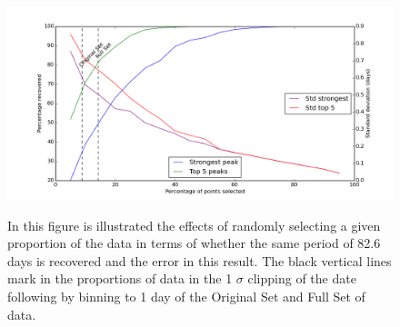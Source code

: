 \begin{figure}[!htbp]
\begin{center}
\includegraphics[scale=0.4]{Figures/prop.png} \\
\end{center}   
\caption{In this figure is illustrated the effects of randomly selecting a given proportion of the {\asas} data in terms
  of whether the same period of 82.6 days is recovered and the error in this result. The black vertical lines mark in
  the proportions of data in the 1 $\sigma$ clipping of the {\harps} date following by binning to 1 day of the Original
  Set and Full Set of data.}
\protect\label{fig:asasprop}
\end{figure}
